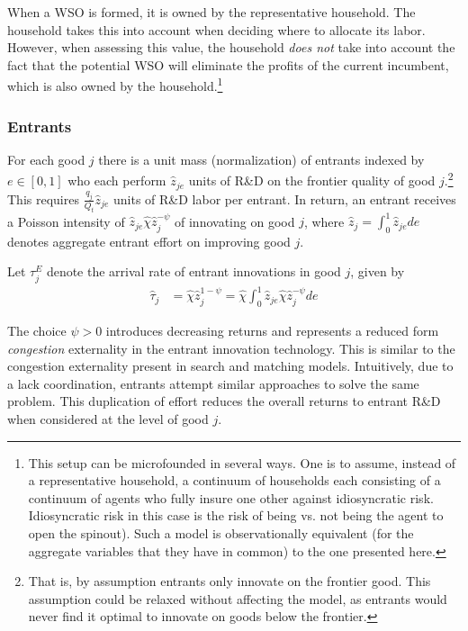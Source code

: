 \documentclass[11pt,english]{article}
\theoremstyle{remark}
\begin{document}
When a WSO is formed, it is owned by the representative household. The household takes this into account when deciding where to allocate its labor. However, when assessing this value, the household \textit{does not} take into account the fact that the potential WSO will eliminate the profits of the current incumbent, which is also owned by the household.\footnote{This setup can be microfounded in several ways. One is to assume, instead of a representative household, a continuum of households each consisting of a continuum of agents who fully insure one other against idiosyncratic risk. Idiosyncratic risk in this case is the risk of being vs. not being the agent to open the spinout). Such a model is observationally equivalent (for the aggregate variables that they have in common) to the one presented here.} 



\subsubsection{Entrants} \label{subsubsec:entrants}

For each good $j$ there is a unit mass (normalization) of entrants indexed by $e \in [0,1]$ who each perform $\hat{z}_{je}$ units of R\&D on the frontier quality of good $j$.\footnote{That is, by assumption entrants only innovate on the frontier good. This assumption could be relaxed without affecting the model, as entrants would never find it optimal to innovate on goods below the frontier.} This requires $\frac{q_j}{Q_t}\hat{z}_{je}$ units of R\&D labor per entrant. In return, an entrant receives a Poisson intensity of $\hat{z}_{je} \hat{\chi} \hat{z}_j^{-\psi}$ of innovating on good $j$, where $\hat{z}_j = \int_0^1 \hat{z}_{je} de$ denotes aggregate entrant effort on improving good $j$. 

Let $\tau_j^E$ denote the arrival rate of entrant innovations in good $j$, given by
\begin{align*}
	\hat{\tau}_j &= \hat{\chi} \hat{z}_j^{1-\psi} = \hat{\chi} \int_0^1 \hat{z}_{je} \hat{\chi} \hat{z}_j^{-\psi} de 
\end{align*}

The choice $\psi > 0$ introduces decreasing returns and represents a reduced form \textit{congestion} externality in the entrant innovation technology. This is similar to the congestion externality present in search and matching models. Intuitively, due to a lack coordination, entrants attempt similar approaches to solve the same problem. This duplication of effort reduces the overall returns to entrant R\&D when considered at the level of good $j$.
\end{document}
